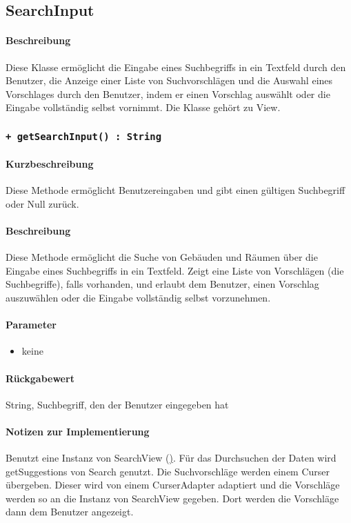 \subsection{SearchInput}
\paragraph*{Beschreibung}
Diese Klasse ermöglicht die Eingabe eines Suchbegriffs in ein Textfeld durch den Benutzer, 
die Anzeige einer Liste von Suchvorschlägen und die Auswahl eines Vorschlages durch den Benutzer, 
indem er einen Vorschlag auswählt oder die Eingabe vollständig selbst vornimmt.
Die Klasse gehört zu View.

\subsubsection{\texttt{+ getSearchInput() : String}}%
\paragraph*{Kurzbeschreibung}
Diese Methode ermöglicht Benutzereingaben und gibt einen gültigen Suchbegriff oder Null zurück.
\paragraph*{Beschreibung}
Diese Methode ermöglicht die Suche von Gebäuden und Räumen über die Eingabe eines Suchbegriffs in ein Textfeld.
Zeigt eine Liste von Vorschlägen (die Suchbegriffe), falls vorhanden, und erlaubt dem Benutzer, einen Vorschlag auszuwählen oder die Eingabe vollständig selbst vorzunehmen.
\paragraph*{Parameter}
\begin{itemize}
    \item keine
\end{itemize}
\paragraph*{Rückgabewert}
String, Suchbegriff, den der Benutzer eingegeben hat
\paragraph*{Notizen zur Implementierung}
Benutzt eine Instanz von SearchView (\href{https://developer.android.com/guide/topics/search/search-dialog#SearchableActivity}).
Für das Durchsuchen der Daten wird getSuggestions von Search genutzt.
Die Suchvorschläge werden einem Curser übergeben.
Dieser wird von einem CurserAdapter adaptiert und die Vorschläge werden so an die Instanz von SearchView gegeben.
Dort werden die Vorschläge dann dem Benutzer angezeigt.



